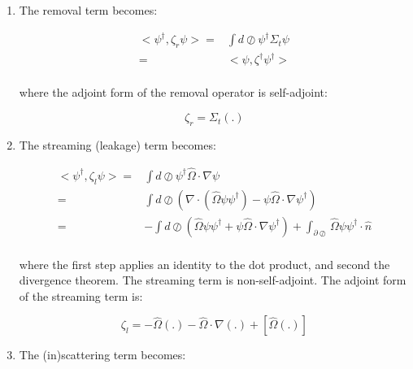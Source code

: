\documentclass[10pt]{article}
\newcommand{\hO}{\hat{\Omega}}
\begin{document}
\begin{flushleft}
\begin{enumerate}
\item The removal term becomes:

\begin{equation}
\begin{aligned}
<\psi^\dagger,\zeta_r\psi>= & \int d\oslash \psi^\dagger \Sigma_t\psi\\
= & <\psi,\zeta^\dagger\psi^\dagger>\\
\end{aligned}
\end{equation}

where the adjoint form of the removal operator is self-adjoint:

\begin{equation}
\zeta_r=\Sigma_t(.)
\end{equation}

\item The streaming (leakage) term becomes:

\begin{equation}
\begin{aligned}
<\psi^\dagger,\zeta_l\psi>= & \int d\oslash \psi^\dagger\hO  \cdot\nabla\psi\\
= & \int d\oslash \left(\nabla\cdot(\hO  \psi\psi^\dagger)-\psi\hO  \cdot\nabla\psi^\dagger\right)\\
= & -\int d\oslash \left(\hO  \psi\psi^\dagger +\psi\hO  \cdot\nabla\psi^\dagger\right)+ \int_{\partial\oslash}\hO  \psi\psi^\dagger\cdot\hat{n}\\
\end{aligned}
\end{equation}

where the first step applies an identity to the dot product, and second the divergence theorem. The streaming term is non-self-adjoint. The adjoint form of the streaming term is:

\begin{equation}
\zeta_l=-\hO  (.)-\hO  \cdot\nabla(.)+\left\lbrack\hO  (.)\right\rbrack
\end{equation}

\item The (in)scattering term becomes:


\end{enumerate}
\end{flushleft}
\end{document}
